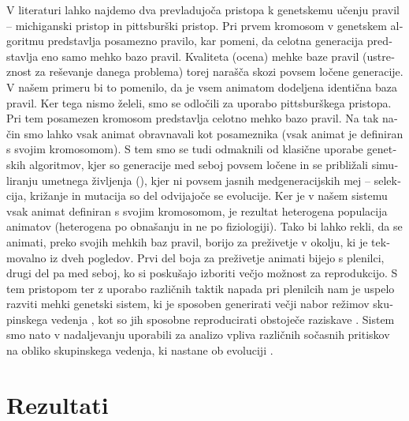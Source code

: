 \begin{slovenian}
V literaturi lahko najdemo dva prevladujoča pristopa k genetskemu učenju pravil -- michiganski pristop \cite{holland1977cognitive} in pittsburški \cite{smith1980learning} pristop. Pri prvem kromosom v genetskem algoritmu predstavlja posamezno pravilo, kar pomeni, da celotna generacija predstavlja eno samo mehko bazo pravil. Kvaliteta (ocena) mehke baze pravil (ustreznost za reševanje danega problema) torej narašča skozi povsem ločene generacije. V našem primeru bi to pomenilo, da je vsem animatom dodeljena identična baza pravil. Ker tega nismo želeli, smo se odločili za uporabo pittsburškega pristopa. Pri tem posamezen kromosom predstavlja celotno mehko bazo pravil. Na tak način smo lahko vsak animat obravnavali kot posameznika (vsak animat je definiran s svojim kromosomom). S tem smo se tudi odmaknili od klasične uporabe genetskih algoritmov, kjer so generacije med seboj povsem ločene in se približali simuliranju umetnega življenja (), kjer ni povsem jasnih medgeneracijskih mej -- selekcija, križanje in mutacija so del odvijajoče se evolucije. Ker je v našem sistemu vsak animat definiran s svojim kromosomom, je rezultat heterogena populacija animatov (heterogena po obnašanju in ne po fiziologiji). Tako bi lahko rekli, da se animati, preko svojih mehkih baz pravil, borijo za preživetje v okolju, ki je tekmovalno iz dveh pogledov. Prvi del boja za preživetje animati bijejo s plenilci, drugi del pa med seboj, ko si poskušajo izboriti večjo možnost za reprodukcijo. S tem pristopom ter z uporabo različnih taktik napada pri plenilcih nam je uspelo razviti mehki genetski sistem, ki je sposoben generirati večji nabor režimov skupinskega vedenja \cite{demsar2017evolution}, kot so jih sposobne reproducirati obstoječe raziskave \cite{biswas2014causes,hein2015evolution,olson2013predator,olson2015exploring,olson2016evolution,reynolds1993evolved,sayers2009evolved,spector2003emergence,wood2007evolving}. Sistem smo nato v nadaljevanju uporabili za analizo vpliva različnih sočasnih pritiskov na obliko skupinskega vedenja, ki nastane ob evoluciji \cite{demsar2016balanced}.

\section{Rezultati}


\end{slovenian}

